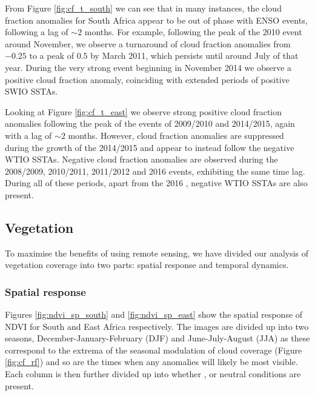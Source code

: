 From Figure \ref{fig:cf_t_south} we can see that in many instances, the
cloud fraction anomalies for South Africa appear to be out of phase
with ENSO events, following a lag of ${\sim}2$ months. For example,
following the peak of the 2010 \nina{} event around November, we
observe a turnaround of cloud fraction anomalies from $-0.25$ to a
peak of $0.5$ by March 2011, which persists until around July of that
year. During the very strong \elnino{} event beginning in November
2014 we observe a positive cloud fraction anomaly, coinciding with
extended periods of positive SWIO SSTAs.

Looking at Figure \ref{fig:cf_t_east} we observe strong positive cloud
fraction anomalies following the peak of the \elnino{} events of
2009/2010 and 2014/2015, again with a lag of ${\sim}2$ months. However,
cloud fraction anomalies are suppressed during the growth of the
2014/2015 \elnino{} and appear to instead follow the negative WTIO
SSTAs. Negative cloud fraction anomalies are observed during the
2008/2009, 2010/2011, 2011/2012 and 2016 \nina{} events, exhibiting
the same time lag. During all of these periods, apart from the 2016
\nina{}, negative WTIO SSTAs are also present.

\subsection{Vegetation}
To maximise the benefits of using remote sensing, we have divided our
analysis of vegetation coverage into two parts: spatial response and
temporal dynamics.

\subsubsection{Spatial response}
Figures \ref{fig:ndvi_sp_south} and \ref{fig:ndvi_sp_east} show the
spatial response of NDVI for South and East Africa respectively. The
images are divided up into two seasons, December-January-February
(DJF) and June-July-August (JJA) as these correspond to the extrema of
the seasonal modulation of cloud coverage (Figure \ref{fig:cf_rf}) and
so are the times when any anomalies will likely be most visible. Each
column is then further divided up into whether \elnino{}, \nina{} or
neutral conditions are present.

